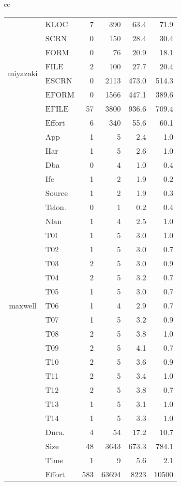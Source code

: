 \begin{table*}[t!]
\begin{tabular}{cc}
\begin{tabular}{|c|l|rrrr|}
\multirow{8}{*}{\begin{sideways}miyazaki\end{sideways}}
& KLOC & 7 & 390 & 63.4 & 71.9\\
& SCRN & 0 & 150 & 28.4 & 30.4\\
& FORM & 0 & 76 & 20.9 & 18.1\\
& FILE & 2 & 100 & 27.7 & 20.4\\
& ESCRN & 0 & 2113 & 473.0 & 514.3\\
& EFORM & 0 & 1566 & 447.1 & 389.6\\
& EFILE & 57 & 3800 & 936.6 & 709.4\\
& Effort & 6 & 340 & 55.6 & 60.1\\
\hline
\multirow{26}{*}{\begin{sideways}maxwell\end{sideways}}
& App & 1 & 5 & 2.4 & 1.0\\
& Har & 1 & 5 & 2.6 & 1.0\\
& Dba & 0 & 4 & 1.0 & 0.4\\
& Ifc & 1 & 2 & 1.9 & 0.2\\
& Source & 1 & 2 & 1.9 & 0.3\\
& Telon. & 0 & 1 & 0.2 & 0.4\\
& Nlan & 1 & 4 & 2.5 & 1.0\\
& T01 & 1 & 5 & 3.0 & 1.0\\
& T02 & 1 & 5 & 3.0 & 0.7\\
& T03 & 2 & 5 & 3.0 & 0.9\\
& T04 & 2 & 5 & 3.2 & 0.7\\
& T05 & 1 & 5 & 3.0 & 0.7\\
& T06 & 1 & 4 & 2.9 & 0.7\\
& T07 & 1 & 5 & 3.2 & 0.9\\
& T08 & 2 & 5 & 3.8 & 1.0\\
& T09 & 2 & 5 & 4.1 & 0.7\\
& T10 & 2 & 5 & 3.6 & 0.9\\
& T11 & 2 & 5 & 3.4 & 1.0\\
& T12 & 2 & 5 & 3.8 & 0.7\\
& T13 & 1 & 5 & 3.1 & 1.0\\
& T14 & 1 & 5 & 3.3 & 1.0\\
& Dura. & 4 & 54 & 17.2 & 10.7\\
& Size & 48 & 3643 & 673.3 & 784.1\\
& Time & 1 & 9 & 5.6 & 2.1\\
& Effort & 583 & 63694 & 8223 & 10500\\
\hline


\end{tabular}
\end{tabular}
\end{table*}
